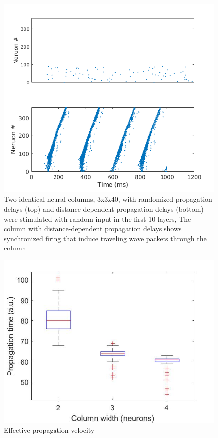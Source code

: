 \documentclass[a4paper,11pt]{article}
\begin{document}
\begin{figure}[p]
 \caption{Two identical neural columns, 3x3x40, with randomized propagation delays (top) and distance-dependent propagation delays (bottom) were stimulated with random input in the first 10 layers,
 The column with distance-dependent propagation delays shows synchronized firing that induce traveling wave packets through the column.}
 \label{fig:delaycompare}
 \centering
   \includegraphics[width=\textwidth]{fig/DelayCompare_RandInput}
\end{figure}

\begin{figure}[p]
 \caption{Effective propagation velocity}
 \label{fig:propagation_time}
 \centering
   \includegraphics[width=\textwidth]{fig/propagation_time}
\end{figure}
\end{document}

